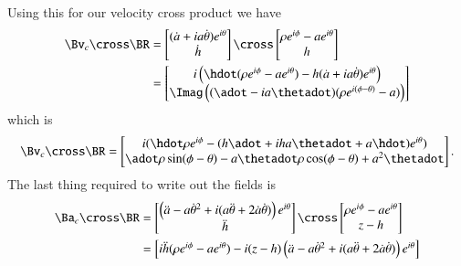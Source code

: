 {Using this for our velocity cross product we have
%
\begin{equation}\label{eqn:relativisticElectrodynamicsExamReflection:1310}
\begin{aligned}
\Bv_c \cross \BR
&=
\begin{bmatrix}
(\dot{a} + i a \dot{\theta}) e^{i\theta} \\
\dot{h}
\end{bmatrix}
\cross
\begin{bmatrix}
\rho e^{i\phi} - a e^{i\theta} \\
h
\end{bmatrix} \\
&=
\begin{bmatrix}
i\left(\hdot ( \rho e^{i\phi} - a e^{i\theta} ) - h (\dot{a} + i a \dot{\theta}) e^{i\theta} \right) \\
\Imag \left( ( \adot - i a \thetadot) (\rho e^{i(\phi - \theta)} - a) \right)
\end{bmatrix}
\end{aligned}
\end{equation}
%
which is
%
\begin{equation}\label{eqn:relativisticElectrodynamicsExamReflection:970}
\Bv_c \cross \BR
=
\begin{bmatrix}
i( \hdot \rho e^{i\phi} - (h \adot + i h a \thetadot + a \hdot) e^{i\theta} ) \\
\adot \rho \sin(\phi - \theta) - a \thetadot \rho \cos(\phi - \theta) + a^2 \thetadot
\end{bmatrix}.
\end{equation}
%
The last thing required to write out the fields is
%
\begin{equation}\label{eqn:relativisticElectrodynamicsExamReflection:1330}
\begin{aligned}
\Ba_c \cross \BR
&=
\begin{bmatrix}
\left( \ddot{a} - a {\dot{\theta}}^2 + i ( a\ddot{\theta} + 2 \dot{a} \dot{\theta} ) \right) e^{i\theta} \\
\ddot{h}
\end{bmatrix}
\cross
\begin{bmatrix}
\rho e^{i\phi} - a e^{i\theta} \\
z - h
\end{bmatrix} \\
&=
\begin{bmatrix}
i \ddot{h} (\rho e^{i\phi} - a e^{i\theta} ) - i (z - h) \left( \ddot{a} - a {\dot{\theta}}^2 + i ( a\ddot{\theta} + 2 \dot{a} \dot{\theta} ) \right) e^{i\theta} \\

\end{bmatrix}
\end{aligned}
\end{equation}}
